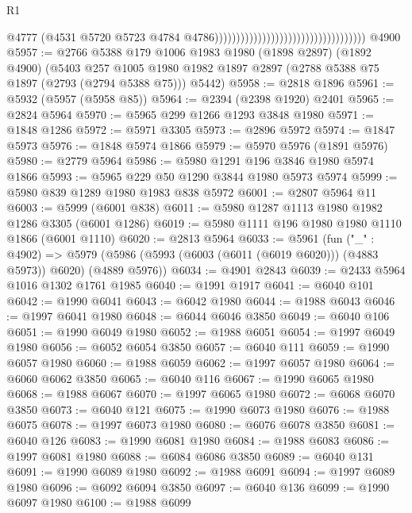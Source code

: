 \begin{lexlean}{R1}
\begin{coremodule}
                                                                        @4777
                                                                        (@4531
                                                                          @5720
                                                                          @5723
                                                                          @4784
                                                                          @4786)))))))))))))))))))))))))))))))))))
    @4900
@5957 := @2766
    @5388
    @179
    @1006
    @1983
    @1980
    (@1898 @2897)
    (@1892 @4900)
    (@5403
      @257
      @1005
      @1980
      @1982
      @1897
      @2897
      (@2788 @5388 @75 @1897 (@2793 (@2794 @5388 @75)))
      @5442)
@5958 := @2818 @1896
@5961 := @5932 (@5957 (@5958 @85))
@5964 := @2394 (@2398 @1920) @2401
@5965 := @2824 @5964
@5970 := @5965 @299 @1266 @1293 @3848 @1980
@5971 := @1848 @1286
@5972 := @5971 @3305
@5973 := @2896 @5972
@5974 := @1847 @5973
@5976 := @1848 @5974 @1866
@5979 := @5970 @5976 (@1891 @5976)
@5980 := @2779 @5964
@5986 := @5980 @1291 @196 @3846 @1980 @5974 @1866
@5993 := @5965 @229 @50 @1290 @3844 @1980 @5973 @5974
@5999 := @5980 @839 @1289 @1980 @1983 @838 @5972
@6001 := @2807 @5964 @11
@6003 := @5999 (@6001 @838)
@6011 := @5980 @1287 @1113 @1980 @1982 @1286 @3305 (@6001 @1286)
@6019 := @5980 @1111 @196 @1980 @1980 @1110 @1866 (@6001 @1110)
@6020 := @2813 @5964
@6033 := @5961
    (fun ("_" : @4902) =>
    @5979 (@5986 (@5993 (@6003 (@6011 (@6019 @6020))) (@4883 @5973)) @6020) (@4889 @5976))
@6034 := @4901 @2843
@6039 := @2433 @5964 @1016 @1302 @1761 @1985
@6040 := @1991 @1917
@6041 := @6040 @101
@6042 := @1990 @6041
@6043 := @6042 @1980
@6044 := @1988 @6043
@6046 := @1997 @6041 @1980
@6048 := @6044 @6046 @3850
@6049 := @6040 @106
@6051 := @1990 @6049 @1980
@6052 := @1988 @6051
@6054 := @1997 @6049 @1980
@6056 := @6052 @6054 @3850
@6057 := @6040 @111
@6059 := @1990 @6057 @1980
@6060 := @1988 @6059
@6062 := @1997 @6057 @1980
@6064 := @6060 @6062 @3850
@6065 := @6040 @116
@6067 := @1990 @6065 @1980
@6068 := @1988 @6067
@6070 := @1997 @6065 @1980
@6072 := @6068 @6070 @3850
@6073 := @6040 @121
@6075 := @1990 @6073 @1980
@6076 := @1988 @6075
@6078 := @1997 @6073 @1980
@6080 := @6076 @6078 @3850
@6081 := @6040 @126
@6083 := @1990 @6081 @1980
@6084 := @1988 @6083
@6086 := @1997 @6081 @1980
@6088 := @6084 @6086 @3850
@6089 := @6040 @131
@6091 := @1990 @6089 @1980
@6092 := @1988 @6091
@6094 := @1997 @6089 @1980
@6096 := @6092 @6094 @3850
@6097 := @6040 @136
@6099 := @1990 @6097 @1980
@6100 := @1988 @6099

\end{coremodule}
\end{lexlean}
